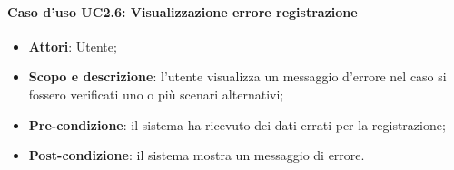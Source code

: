 \paragraph{Caso d'uso UC2.6: Visualizzazione errore registrazione}
\begin{itemize}
\item \textbf{Attori}: Utente;
\item \textbf{Scopo e descrizione}: l'utente visualizza un messaggio d'errore nel caso si fossero verificati uno o più scenari alternativi;
\item \textbf{Pre-condizione}: il sistema ha ricevuto dei dati errati per la registrazione;
\item \textbf{Post-condizione}: il sistema mostra un messaggio di errore.
\end{itemize}
